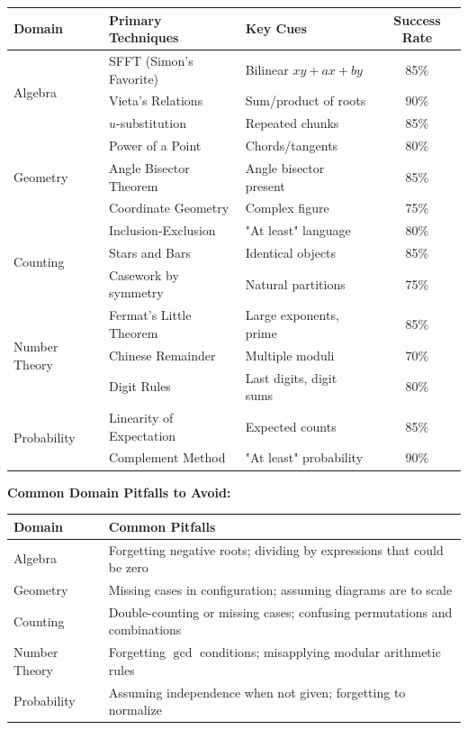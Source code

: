 \documentclass{article}
\begin{document}
\begin{center}
\begin{tabular}{|l|l|l|c|}
\hline
\textbf{Domain} & \textbf{Primary Techniques} & \textbf{Key Cues} & \textbf{Success Rate} \\
\hline
\multirow{3}{*}{Algebra} & SFFT (Simon's Favorite) & Bilinear $xy+ax+by$ & 85\% \\
& Vieta's Relations & Sum/product of roots & 90\% \\
& $u$-substitution & Repeated chunks & 85\% \\
\hline
\multirow{3}{*}{Geometry} & Power of a Point & Chords/tangents & 80\% \\
& Angle Bisector Theorem & Angle bisector present & 85\% \\
& Coordinate Geometry & Complex figure & 75\% \\
\hline
\multirow{3}{*}{Counting} & Inclusion-Exclusion & "At least" language & 80\% \\
& Stars and Bars & Identical objects & 85\% \\
& Casework by symmetry & Natural partitions & 75\% \\
\hline
\multirow{3}{*}{Number Theory} & Fermat's Little Theorem & Large exponents, prime & 85\% \\
& Chinese Remainder & Multiple moduli & 70\% \\
& Digit Rules & Last digits, digit sums & 80\% \\
\hline
\multirow{2}{*}{Probability} & Linearity of Expectation & Expected counts & 85\% \\
& Complement Method & "At least" probability & 90\% \\
\hline
\end{tabular}
\end{center}

\textbf{Common Domain Pitfalls to Avoid:}
\begin{center}
\begin{tabular}{|l|l|}
\hline
\textbf{Domain} & \textbf{Common Pitfalls} \\
\hline
Algebra & Forgetting negative roots; dividing by expressions that could be zero \\
Geometry & Missing cases in configuration; assuming diagrams are to scale \\
Counting & Double-counting or missing cases; confusing permutations and combinations \\
Number Theory & Forgetting $\gcd$ conditions; misapplying modular arithmetic rules \\
Probability & Assuming independence when not given; forgetting to normalize \\
\hline
\end{tabular}
\end{center}
\end{document}
